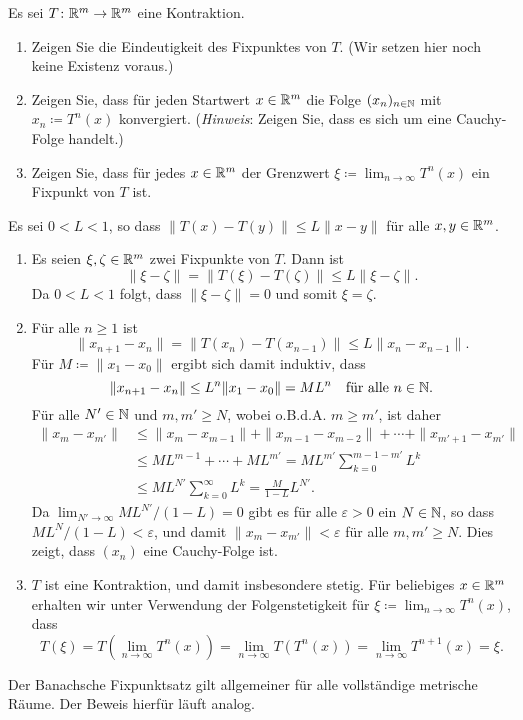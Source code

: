\documentclass[a4paper,10pt]{article}
\begin{document}
\begin{question}
 Es sei $T \colon \mathbb{R}^m \to \mathbb{R}^m$ eine Kontraktion.
 \begin{enumerate}
  \item
   Zeigen Sie die Eindeutigkeit des Fixpunktes von $T$. (Wir setzen hier noch keine Existenz voraus.)
  \item
   Zeigen Sie, dass für jeden Startwert $x \in \mathbb{R}^m$ die Folge $(x_n)_{n \in \mathbb{N}}$ mit $x_n \coloneqq T^n(x)$ konvergiert. (\emph{Hinweis}: Zeigen Sie, dass es sich um eine Cauchy-Folge handelt.)
  \item
   Zeigen Sie, dass für jedes $x \in \mathbb{R}^m$ der Grenzwert $\xi \coloneqq \lim_{n \to \infty} T^n(x)$ ein Fixpunkt von $T$ ist.
 \end{enumerate}
\end{question}
\begin{solution}
 Es sei $0 < L < 1$, so dass $\|T(x)-T(y)\| \leq L\|x-y\|$ für alle $x,y \in \mathbb{R}^m$.
 \begin{enumerate}
  \item
   Es seien $\xi, \zeta \in \mathbb{R}^m$ zwei Fixpunkte von $T$. Dann ist
   \[
    \|\xi-\zeta\| = \|T(\xi)-T(\zeta)\| \leq L\|\xi-\zeta\|.
   \]
   Da $0 < L < 1$ folgt, dass $\|\xi-\zeta\| = 0$ und somit $\xi = \zeta$.
  \item
   Für alle $n \geq 1$ ist
   \[
    \|x_{n+1} - x_n\|
    = \|T(x_n) - T(x_{n-1})\|
    \leq L\|x_n - x_{n-1}\|.
   \]
   Für $M \coloneqq \|x_1 - x_0\|$ ergibt sich damit induktiv, dass
   \[
    \|x_{n+1} - x_n\| \leq L^n \|x_1 - x_0\| = M L^n
    \quad \text{für alle $n \in \mathbb{N}$}.
   \]
   Für alle $N' \in \mathbb{N}$ und $m, m' \geq N$, wobei o.B.d.A. $m \geq m'$, ist daher
   \begin{align*}
    \|x_m - x_{m'}\|
    &\leq \|x_m - x_{m-1}\| + \|x_{m-1} - x_{m-2}\| + \dotsb + \|x_{m'+1} - x_{m'}\| \\
    &\leq M L^{m-1} + \dotsb + M L^{m'}
    = M L^{m'} \sum_{k=0}^{m-1-m'} L^k \\
    &\leq M L^{N'} \sum_{k=0}^\infty L^k
    = \frac{M}{1-L} L^{N'}.
   \end{align*}
   Da $\lim_{N' \to \infty} ML^{N'}/(1-L) = 0$ gibt es für alle $\varepsilon > 0$ ein $N \in \mathbb{N}$, so dass $ML^N/(1-L)< \varepsilon$, und damit $\|x_m - x_{m'}\| < \varepsilon$ für alle $m, m' \geq N$. Dies zeigt, dass $(x_n)$ eine Cauchy-Folge ist.
  \item
   $T$ ist eine Kontraktion, und damit insbesondere stetig. Für beliebiges $x \in \mathbb{R}^m$ erhalten wir unter Verwendung der Folgenstetigkeit für $\xi \coloneqq \lim_{n \to \infty} T^n(x)$, dass
   \[
    T(\xi)
    = T\left(\lim_{n \to \infty} T^n(x)\right)
    = \lim_{n \to \infty} T(T^n(x))
    = \lim_{n \to \infty} T^{n+1}(x)
    = \xi.
   \]
 \end{enumerate}
\end{solution}


\begin{bem}
 Der Banachsche Fixpunktsatz gilt allgemeiner für alle vollständige metrische Räume. Der Beweis hierfür läuft analog.
\end{bem}


\newpage


\printsolutions
\end{document}
